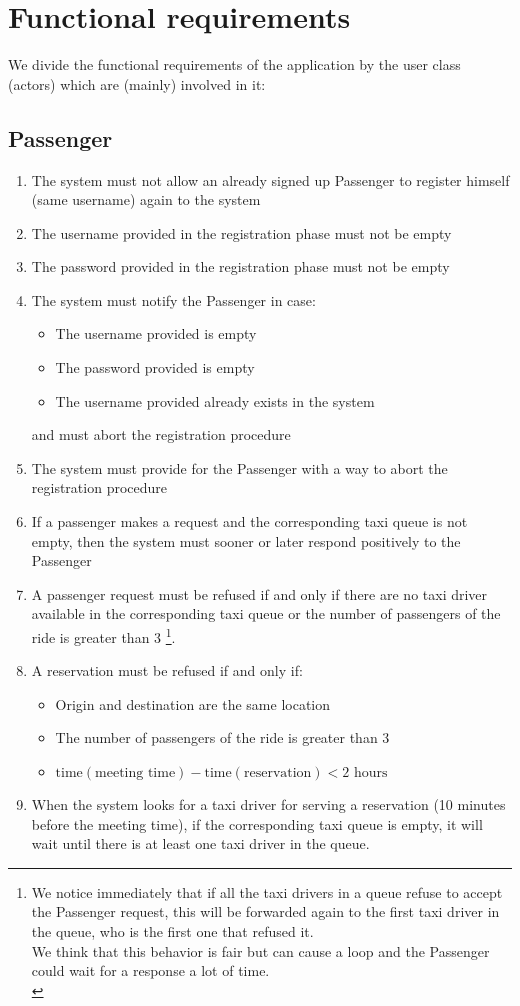 \pagebreak
\section{Functional requirements}
We divide the functional requirements of the application by the user class (actors) which are (mainly) involved in it:
\subsection{Passenger}
\begin{enumerate}[label=R.P.{\arabic*})]
\item The system must not allow an already signed up Passenger to register himself (same username) again to the system
\item The username provided in the registration phase must not be empty
\item The password provided in the registration phase must not be empty
\item The system must notify the Passenger in case: 
	\begin{itemize}
	\item The username provided is empty
	\item The password provided is empty
	\item The username provided already exists in the system
	\end{itemize}
	and must abort the registration procedure
\item The system must provide for the Passenger with a way to abort the registration procedure
\item If a passenger makes a request and the corresponding taxi queue is not empty, then the system must sooner or later respond positively to the Passenger
\item A passenger request must be refused if and only if there are no taxi driver available in the corresponding taxi queue or the number of passengers of the ride is greater than 3 \footnote{We notice immediately that if all the taxi drivers in a queue refuse to accept the Passenger request, this will be forwarded again to the first taxi driver in the queue, who is the first one that refused it.
	\\ We think that this behavior is fair but can cause a loop and the Passenger could wait for a response a lot of time.\\}.
\item A reservation must be refused if and only if:
\begin{itemize}
	\item Origin and destination are the same location
	\item The number of passengers of the ride is greater than 3
	\item $\text{time}(\text{meeting time}) - \text{time}(\text{reservation}) < \text{2 hours}$
\end{itemize}
\item When the system looks for a taxi driver for serving a reservation (10 minutes before the meeting time), if the corresponding taxi queue is empty, it will wait until there is at least one taxi driver in the queue.
\end{enumerate}


